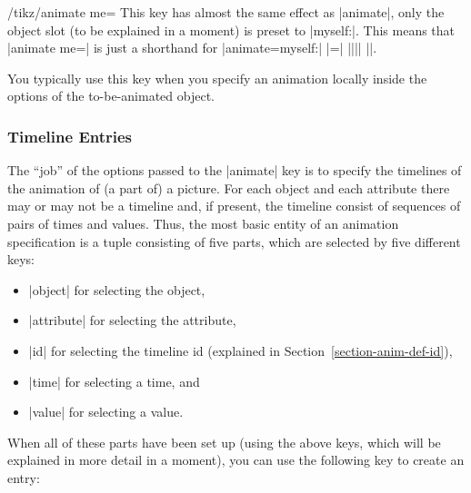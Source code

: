 \begin{key}{/tikz/animate me=}
  This key has almost the same effect as |animate|, only the object
  slot (to be explained in a moment) is preset to |myself:|. This
  means that |animate me=| is just a shorthand for
  |animate={myself:| |=| |{||}| |}|.

  You typically use this key when you specify an animation locally
  inside the options of the to-be-animated object.
\end{key}


\subsubsection{Timeline Entries}

The ``job'' of the options passed to the |animate| key is to specify
the timelines of the animation of (a part of) a picture. For each
object and each attribute there may or may not be a timeline and, if
present, the timeline consist of sequences of pairs of times and
values. Thus, the most basic entity of an animation specification is a
tuple consisting of five parts, which are selected by five different
keys: 
\begin{itemize}
\item |object| for selecting the object,
\item |attribute| for selecting the attribute,
\item |id| for selecting the timeline id (explained in
  Section~\ref{section-anim-def-id}),
\item |time| for selecting a time, and
\item |value| for selecting a value.
\end{itemize}
When all of these parts have been set up (using the above keys, which
will be explained in more detail in a moment), you can use the
following key to create an entry:

